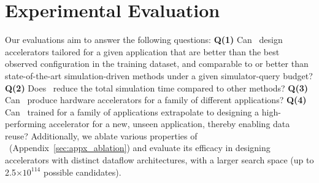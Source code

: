 \section{Experimental Evaluation}
\label{sec:eval}
%
Our evaluations aim to answer the following questions: \textbf{Q(1)} {Can \primemethodname\ design accelerators tailored for a given application that are better than the best observed configuration in the training dataset, and comparable to or better than state-of-the-art simulation-driven methods under a given simulator-query budget?} \textbf{Q(2)} {Does \primemethodname\ reduce the total simulation time compared to other methods?} \textbf{Q(3)} {Can \primemethodname\ produce hardware accelerators for a family of different applications?} \textbf{Q(4)} {Can \primemethodname\ trained for a family of applications extrapolate to designing a high-performing accelerator for a new, unseen application, thereby enabling data reuse?} Additionally, we ablate various properties of \primemethodname\ (Appendix~\ref{sec:appx_ablation}) and evaluate its efficacy in designing accelerators with distinct dataflow architectures, with a larger search space (up to 2.5$\times10^{114}$ possible candidates).

~

